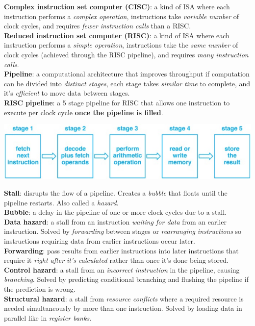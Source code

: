 \documentclass[10pt,landscape]{article}
\begin{document}
\begin{multicols}{3}
\textbf{Complex instruction set computer (CISC)}: a kind of ISA where each instruction performs a \textit{complex operation}, instructions take \textit{variable number} of clock cycles, and requires \textit{fewer instruction calls} than a RISC.\\
\textbf{Reduced instruction set computer (RISC)}:  a kind of ISA where each instruction performs a \textit{simple operation}, instructions take the \textit{same number} of clock cycles (achieved through the RISC pipeline), and requires \textit{many instruction calls}.\\	
\textbf{Pipeline}: a computational architecture that improves throughput if computation can be divided into \textit{distinct stages}, each stage takes \textit{similar time} to complete, and it's \textit{efficient} to move data between stages.\\
\textbf{RISC pipeline}: a 5 stage pipeline for RISC that allows one instruction to execute per clock cycle \textbf{once the pipeline is filled}.\\
{\centering\includegraphics[scale=0.39]{img/rp.png}\par}
\textbf{Stall}: disrupts the flow of a pipeline. Creates a \textit{bubble} that floats until the pipeline restarts. Also called a \textit{hazard}.\\
\textbf{Bubble}: a delay in the pipeline of one or more clock cycles due to a stall.\\
\textbf{Data hazard}: a stall from an instruction \textit{waiting for data} from an earlier instruction. Solved by \textit{forwarding} between stages or \textit{rearranging instructions} so instructions requiring data from earlier instructions occur later. \\
\textbf{Forwarding}: pass results from earlier instructions into later instructions that require it \textit{right after it's calculated} rather than once it's done being stored.\\
\textbf{Control hazard}: a stall from an \textit{incorrect instruction} in the pipeline, causing \textit{branching}. Solved by predicting conditional branching and flushing the pipeline if the prediction is wrong.\\
\textbf{Structural hazard}: a stall from \textit{resource conflicts} where a required resource is needed simultaneously by more than one instruction. Solved by loading data in parallel like in \textit{register banks}.\\

\end{multicols}
\end{document}
